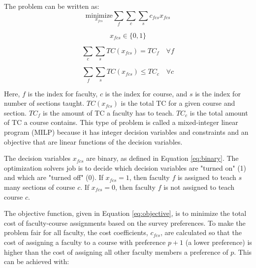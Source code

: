\documentclass{article}
\begin{document}
    The problem can be written as: \\
    
    \begin{equation}
        \underset{x_{fcs}}{\text{minimize}} \sum_{f} \sum_{c} \sum_{s} c_{fcs} x_{fcs}
        \label{eq:objective}
    \end{equation}
    

    \begin{equation}
        x_{fcs} \in \{0, 1\} 
        \label{eq:binary}
    \end{equation}

    \begin{equation}
        \sum_{c} \sum_{s} TC(x_{fcs}) = TC_f \quad \forall f
        \label{eq:constraint1}
    \end{equation}

    \begin{equation}
        \sum_{f} \sum_{s} TC(x_{fcs}) \leq TC_c \quad \forall c
        \label{eq:constraint2}
    \end{equation}

    Here, $f$ is the index for faculty, $c$ is the index for course, and $s$ is the index for number of sections taught.
    $TC(x_{fcs})$ is the total TC for a given course and section.
    $TC_f$ is the amount of TC a faculty has to teach.
    $TC_c$ is the total amount of TC a course contains.
    This type of problem is called a mixed-integer linear program (MILP) because it has integer decision variables and constraints
     and an objective that are linear functions of the decision variables.

    The decision variables $x_{fcs}$ are binary, as defined in Equation \eqref{eq:binary}. 
    The optimization solvers job is to decide which decision variables are "turned on" (1) and which are "turned off" (0).
    If $x_{fcs} = 1$, then faculty $f$ is assigned to teach $s$ many sections of course $c$.
    If $x_{fcs} = 0$, then faculty $f$ is not assigned to teach course $c$.

    The objective function, given in Equation \eqref{eq:objective}, is to minimize the total cost of faculty-course assignments based on the survey preferences.
    To make the problem fair for all faculty, the cost coefficients, $c_{fcs}$, are calculated so that the cost of assigning 
    a faculty to a course with preference $p + 1$ (a lower preference) is higher than the cost of assigning all other faculty members 
    a preference of $p$. This can be achieved with:
\end{document}
